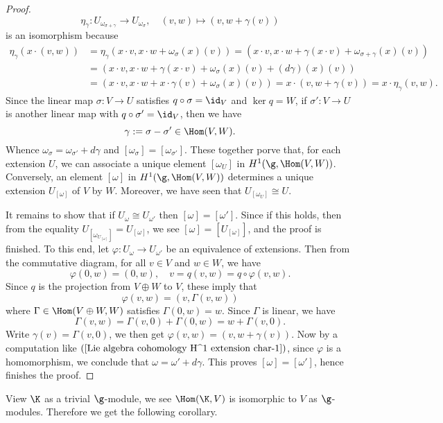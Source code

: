 \begin{proof}
\[\eta_\gamma:U_{\omega_{\sigma+\gamma}}\to U_{\omega_\sigma} ,\quad (v,w)\mapsto(v,w+\gamma(v))\]
is an isomorphism because
\begin{equation}\label{Lie algebra cohomology H^1 extension char-1}
\begin{aligned}
\eta_\gamma(x\cdot(v,w))&=\eta_\gamma(x\cdot v,x\cdot w+\omega_\sigma(x)(v))=(x\cdot v,x\cdot w+\gamma(x\cdot v)+\omega_{\sigma+\gamma}(x)(v))\\
&=(x\cdot v,x\cdot w+\gamma(x\cdot v)+\omega_{\sigma}(x)(v)+(d\gamma)(x)(v))\\
&=(x\cdot v,x\cdot w+x\cdot\gamma(v)+\omega_{\sigma}(x)(v))=x\cdot(v,w+\gamma(v))=x\cdot\eta_\gamma(v,w).
\end{aligned}
\end{equation}
Since the linear map $\sigma:V\to U$ satisfies $q\circ\sigma=\id_V$ and $\ker q=W$, if $\sigma':V\to U$ is another linear map with $q\circ\sigma'=\id_V$, then we have
\[\gamma:=\sigma-\sigma'\in\Hom(V,W).\]
Whence $\omega_\sigma=\omega_{\sigma'}+d\gamma$ and $[\omega_\sigma]=[\omega_{\sigma'}]$. These together porve that, for each extension $U$, we can associate a unique element $[\omega_U]$ in $H^1(\g,\Hom(V,W))$. Conversely, an element $[\omega]$ in $H^1(\g,\Hom(V,W))$ determines a unique extension $U_{[\omega]}$ of $V$ by $W$. Moreover, we have seen that $U_{[\omega_U]}\cong U$.\par
It remains to show that if $U_\omega\cong U_{\omega'}$ then $[\omega]=[\omega']$. Since if this holds, then from the equality $U_{[\omega_{U_{[\omega]}}]}=U_{[\omega]}$, we see $[\omega]=[U_{[\omega]}]$, and the proof is finished. To this end, let $\varphi:U_\omega\to U_{\omega'}$ be an equivalence of extensions. Then from the commutative diagram, for all $v\in V$ and $w\in W$, we have
\[\varphi(0,w)=(0,w),\quad v=q(v,w)=q\circ\varphi(v,w).\]
Since $q$ is the projection from $V\oplus W$ to $V$, these imply that 
\[\varphi(v,w)=(v,\Gamma(v,w))\]
where $\Gamma\in\Hom(V\oplus W,W)$ satisfies $\Gamma(0,w)=w$. Since $\Gamma$ is linear, we have
\[\Gamma(v,w)=\Gamma(v,0)+\Gamma(0,w)=w+\Gamma(v,0).\]
Write $\gamma(v)=\Gamma(v,0)$, we then get $\varphi(v,w)=(v,w+\gamma(v))$. Now by a computation like $(\ref{Lie algebra cohomology H^1 extension char-1})$, since $\varphi$ is a homomorphism, we conclude that $\omega=\omega'+d\gamma$. This proves $[\omega]=[\omega']$, hence finishes the proof.
\end{proof}
View $\K$ as a trivial $\g$-module, we see $\Hom(\K,V)$ is isomorphic to $V$ as $\g$-modules. Therefore we get the following corollary.
